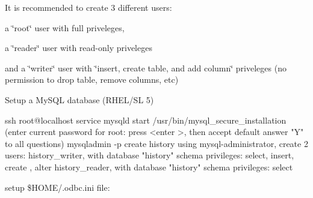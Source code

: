 It is recommended to create 3 different users:
\begin{DoxyItemize}
\item a \char`\"{}root\char`\"{} user with full priveleges,
\item a \char`\"{}reader\char`\"{} user with read-\/only priveleges
\item and a \char`\"{}writer\char`\"{} user with \char`\"{}insert, create table, and add column\char`\"{} priveleges (no permission to drop table, remove columns, etc)
\end{DoxyItemize}


\begin{DoxyEnumerate}
\item Setup a MySQL database (RHEL/SL 5) 
\begin{DoxyCode}
ssh root@localhost
service mysqld start
/usr/bin/mysql_secure_installation (enter current password for root: press <enter
      >, then accept default answer "Y" to all questions)
mysqladmin -p create history
using mysql-administrator, create 2 users:
history_writer, with database "history" schema privileges: select, insert, create
      , alter
history_reader, with database "history" schema privileges: select
\end{DoxyCode}
 
\item setup \$HOME/.odbc.ini file: 
 \label{F_History_logging_F_History_sql_pervariable}
\hypertarget{F_History_logging_F_History_sql_pervariable}{}
 

\end{DoxyEnumerate}
